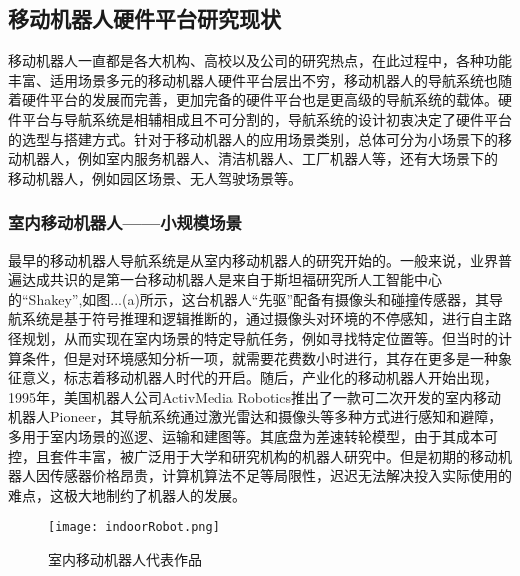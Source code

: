 \subsection{移动机器人硬件平台研究现状}
移动机器人一直都是各大机构、高校以及公司的研究热点，在此过程中，各种功能丰富、适用场景多元的移动机器人硬件平台层出不穷，移动机器人的导航系统也随着硬件平台的发展而完善，更加完备的硬件平台也是更高级的导航系统的载体。硬件平台与导航系统是相辅相成且不可分割的，导航系统的设计初衷决定了硬件平台的选型与搭建方式。针对于移动机器人的应用场景类别，总体可分为小场景下的移动机器人，例如室内服务机器人、清洁机器人、工厂机器人等，还有大场景下的
移动机器人，例如园区场景、无人驾驶场景等。

\subsubsection{室内移动机器人——小规模场景}
最早的移动机器人导航系统是从室内移动机器人的研究开始的。一般来说，业界普遍达成共识的是第一台移动机器人是来自于斯坦福研究所人工智能中心的“Shakey”\cite{raphael1972robot},如图...(a)所示，这台机器人“先驱”配备有摄像头和碰撞传感器，其导航系统是基于符号推理和逻辑推断的，通过摄像头对环境的不停感知，进行自主路径规划，从而实现在室内场景的特定导航任务\cite{nilsson1984shakey}，例如寻找特定位置等。但当时的计算条件，但是对环境感知分析一项，就需要花费数小时进行，其存在更多是一种象征意义，标志着移动机器人时代的开启。随后，产业化的移动机器人开始出现，1995年，美国机器人公司ActivMedia Robotics推出了一款可二次开发的室内移动机器人Pioneer\cite{roumeliotis1998sensor}，其导航系统通过激光雷达和摄像头等多种方式进行感知和避障，多用于室内场景的巡逻、运输和建图等。其底盘为差速转轮模型，由于其成本可控，且套件丰富，被广泛用于大学和研究机构的机器人研究中。但是初期的移动机器人因传感器价格昂贵，计算机算法不足等局限性，迟迟无法解决投入实际使用的难点，这极大地制约了机器人的发展。
\begin{figure}[ht]
  \centering
  \texttt{[image: indoorRobot.png]}
  \caption{室内移动机器人代表作品}
\end{figure}
